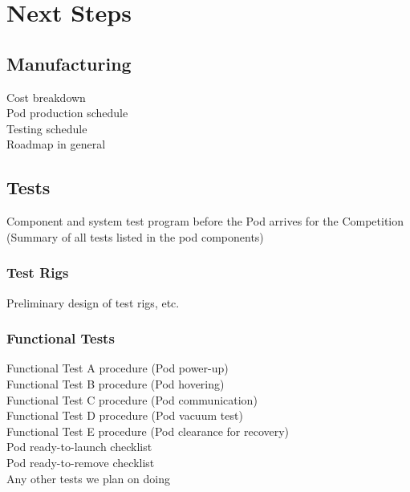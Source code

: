 \documentclass[main.tex]{subfiles}
\begin{document}
    \chapter{Next Steps}
    \section{Manufacturing}
    Cost breakdown\\
    Pod production schedule\\
    Testing schedule\\
    Roadmap in general
    \section{Tests}
    Component and system test program before the Pod arrives for the Competition\\
    (Summary of all tests listed in the pod components)
    \subsection{Test Rigs}
    Preliminary design of test rigs, etc.
    \subsection{Functional Tests}
    Functional Test A procedure (Pod power-up)\\
    Functional Test B procedure (Pod hovering)\\
    Functional Test C procedure (Pod communication)\\
    Functional Test D procedure (Pod vacuum test)\\
    Functional Test E procedure (Pod clearance for recovery)\\
    Pod ready-to-launch checklist\\
    Pod ready-to-remove checklist\\
    Any other tests we plan on doing
\end{document}
